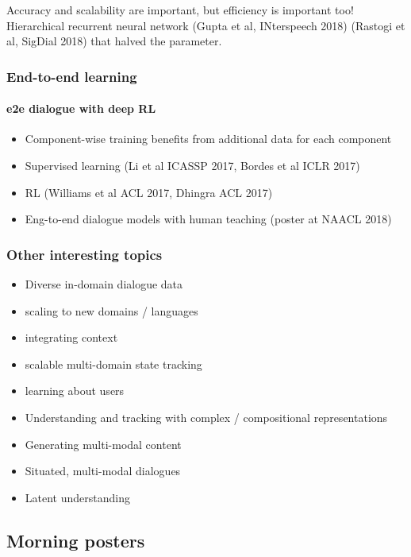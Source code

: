Accuracy and scalability are important, but efficiency is important too!
Hierarchical recurrent neural network  (Gupta et al, INterspeech 2018)
(Rastogi et al, SigDial 2018) that halved the parameter.

\subsubsection{End-to-end learning}
\paragraph{e2e dialogue with deep RL}
\begin{itemize}
	\item Component-wise training benefits from additional data for each component
	\item Supervised learning (Li et al ICASSP 2017, Bordes et al ICLR 2017)
	\item RL (Williams et al ACL 2017, Dhingra ACL 2017)
	\item Eng-to-end dialogue models with human teaching (poster at NAACL 2018)
\end{itemize}

\subsubsection{Other interesting topics}
\begin{itemize}
	\item Diverse in-domain dialogue data
	\item scaling to new domains / languages 
	\item integrating context
	\item scalable multi-domain state tracking
	\item learning about users
	\item Understanding and tracking with complex / compositional representations
	\item Generating multi-modal content
	\item Situated, multi-modal dialogues
	\item Latent understanding
\end{itemize}


\subsection{Morning posters}

